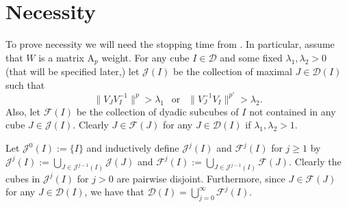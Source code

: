 \documentclass[12pt,reqno ]{amsart}
\numberwithin{equation}{section}
\theoremstyle{definition}
\newcommand{\R}{\ensuremath{\mathbb{R}}}
\newcommand{\D}{\ensuremath{\mathscr{D}}}
\newcommand{\J}{\ensuremath{\mathscr{J}}}
\newcommand{\F}{\ensuremath{\mathscr{F}}}
\begin{document}
\begin{comment}
Thus, to finish the proof it is enough to let $C_j = C_{j, u}$ for fixed $u$ and estimate the integral operator on $L^2(\R)$ with kernel \begin{equation*} \sum_{I \in C_{j - k + 1}} \frac{1_I(s) 1_I(t)}{|I|}  \|W^\frac12 (t) (m_{J^k (t)} W)^{-\frac12} \| \| W^{-\frac12} (s) (m_{J^k(t)} W)^\frac12\|. \end{equation*}

Note that $|I| = 2^{j - k  + 1}$ and $|J^{(k)} (t)| = 2^{-k}$ with $I \cap J^{(k)} (t) \neq \emptyset$ so that $J^{(k)} (t) \subseteq 2I$.  Also, the above integral operator is block diagonal so we estimate the integral operator via the Hilbert-Schmidt norm of each block (i.e. each $I \in C_{j + k + 1}$), which is \begin{equation*} \lesssim \left[\frac{1}{|I|} \int_I \|W^\frac12 (t) (m_{2I} W)^{-\frac12}\|^2 \, dt\right]^\frac12 \left[\frac{1}{|I|} \int_I \|W^{-\frac12} (s) (m_{2I} W)^{\frac12}\|^2 \, ds\right]^\frac12 \lesssim \|W\|_{\text{A}_2} ^\frac12 \end{equation*}  \hfill $\square$ \\
\end{comment}



\section{Necessity}
To prove necessity we will need the stopping time from \cite{I,IKP}.  In particular,  assume that $W$ is a matrix A${}_p$ weight. For any cube $I \in \D$ and some fixed $\lambda_1, \lambda_2  > 0$ (that will be specified later,) let $\J(I)$ be the collection of maximal $J \in \D(I)$ such that \begin{equation}     \|V_J V_I ^{-1} \|^p > \lambda_1 \  \  \text{   or   }  \ \  \| V_J ^{-1} V_I \|^{p'} > \lambda_2. \label{STDef} \end{equation}   Also, let $\F(I)$ be the collection of dyadic subcubes of $I$ not contained in any cube $J \in \J(I)$.  Clearly $J \in \F(J)$ for any $J \in \D(I)$ if $\lambda_1, \lambda_2 > 1$.

Let $\J^0 (I) := \{I\}$ and inductively define $\J^j(I)$ and $\F^j(I)$ for $j \geq 1$ by $\J^j (I) := \bigcup_{J \in \J^{j - 1} (I)} \J(J)$ and $\F^j (I) := \bigcup_{J \in \J^{j - 1} (I)} \F(J)$. Clearly the cubes in $\J^j(I)$ for $j > 0$ are pairwise disjoint.  Furthermore, since $J \in \F(J)$ for any $J \in \D(I)$, we have that $\D(I) = \bigcup_{j = 0}^\infty \F^j(I)$.
\end{document}
